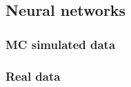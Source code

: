 \subsection{Neural networks}
\label{sec:resultsNN}

\subsubsection{MC simulated data}

\subsubsection{Real data}